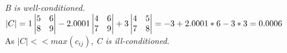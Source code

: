 \begin{exercise}{1}
\textit{B is well-conditioned.} \\

$
\vert C \vert = 1 
\begin{vmatrix}
5&6 \\ 8&9
\end{vmatrix} - 2.0001
\begin{vmatrix}
4&6 \\ 7&9
\end{vmatrix} + 3
\begin{vmatrix}
4&5 \\ 7&8
\end{vmatrix} = -3 + 2.0001*6 - 3*3 = 0.0006 \\
$ \\

As $\vert C \vert << max(c_{ij})$, \textit{C is ill-conditioned.} \\
\end{exercise}

